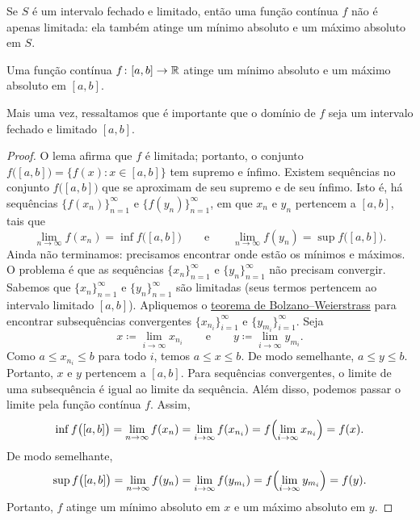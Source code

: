 Se $S$ é um intervalo fechado
e limitado, então uma função contínua $f$
não é apenas limitada: ela também atinge um mínimo absoluto e um máximo absoluto
em $S$.

\begin{thm}
%
%
%
Uma função contínua $f \colon [a,b] \to {\mathbb{R}}$
atinge um mínimo absoluto e um máximo absoluto em $[a,b]$.
\end{thm}

Mais uma vez, ressaltamos que é importante que o domínio de $f$ seja um intervalo fechado e limitado $[a,b]$.

\begin{proof}
O lema afirma que $f$ é limitada; portanto,
o conjunto $f\bigl([a,b]\bigr) = \bigl\{ f(x) : x \in [a,b] \bigr\}$ tem supremo e ínfimo.
Existem sequências
no conjunto $f\bigl([a,b]\bigr)$ que se aproximam de seu supremo e de seu ínfimo.
Isto é, há sequências
$\bigl\{ f(x_n) \bigr\}_{n=1}^\infty$ e $\bigl\{ f(y_n)
\bigr\}_{n=1}^\infty$, em que $x_n$ e $y_n$ pertencem a $[a,b]$,
tais que
\begin{equation*}
\lim_{n\to\infty} f(x_n) = \inf f\bigl([a,b]\bigr) \qquad \text{e} \qquad
\lim_{n\to\infty} f(y_n) = \sup f\bigl([a,b]\bigr).
\end{equation*}
Ainda não terminamos: precisamos encontrar onde estão os mínimos e máximos.
O problema é que as sequências $\{ x_n \}_{n=1}^\infty$ e
$\{ y_n \}_{n=1}^\infty$ não precisam convergir.
Sabemos que $\{ x_n \}_{n=1}^\infty$ e $\{ y_n \}_{n=1}^\infty$ são limitadas
(seus termos pertencem ao intervalo limitado $[a,b]$).
Apliquemos o
\hyperref[thm:bwseq]{teorema de Bolzano--Weierstrass}
para encontrar
subsequências convergentes
$\{ x_{n_i} \}_{i=1}^\infty$ e
$\{ y_{m_i} \}_{i=1}^\infty$. Seja
\begin{equation*}
x \coloneqq \lim_{i\to\infty} x_{n_i}
\qquad \text{e} \qquad
y \coloneqq \lim_{i\to\infty} y_{m_i}.
\end{equation*}
Como $a \leq x_{n_i} \leq b$ para todo $i$, temos $a \leq x \leq b$.
De modo semelhante, $a \leq y \leq b$. Portanto, $x$ e $y$ pertencem a $[a,b]$.
Para sequências convergentes,
o limite de uma subsequência é igual ao limite da
sequência. Além disso, podemos passar o limite pela função contínua $f$. Assim,
\begin{equation*}
\inf f\bigl([a,b]\bigr) = \lim_{n\to\infty} f(x_n)
= \lim_{i\to\infty} f(x_{n_i}) = 
f \Bigl( \lim_{i\to\infty} x_{n_i} \Bigr) = f(x) .
\end{equation*}
De modo semelhante,
\begin{equation*}
\sup f\bigl([a,b]\bigr) = \lim_{n\to\infty} f(y_n)
= \lim_{i\to\infty} f(y_{m_i}) = 
f \Bigl( \lim_{i\to\infty} y_{m_i} \Bigr) = f(y) .
\end{equation*}
Portanto, $f$ atinge um mínimo absoluto em $x$ e
um máximo absoluto em $y$.
\end{proof}

